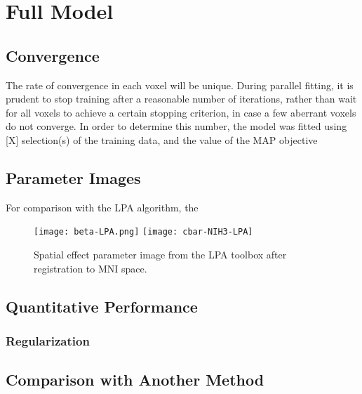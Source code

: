 \section{Full Model}
\subsection{Convergence}
The rate of convergence in each voxel will be unique.
During parallel fitting, it is prudent to stop training after a reasonable number of iterations,
rather than wait for all voxels to achieve a certain stopping criterion,
in case a few aberrant voxels do not converge.
In order to determine this number, the model was fitted using [X] selection(s) of the training data,
and the value of the MAP objective 


\subsection{Parameter Images}\label{ss:paramimg}

For comparison with the LPA algorithm, the
\begin{figure}
  \centering
  \texttt{[image: beta-LPA.png]}
  \texttt{[image: cbar-NIH3-LPA]}
  \caption{Spatial effect parameter image from the LPA toolbox after registration to MNI space.}%
  \label{fig:B-lpa}
\end{figure}

\subsection{Quantitative Performance}
\subsubsection{Regularization}
\subsection{Comparison with Another Method}
